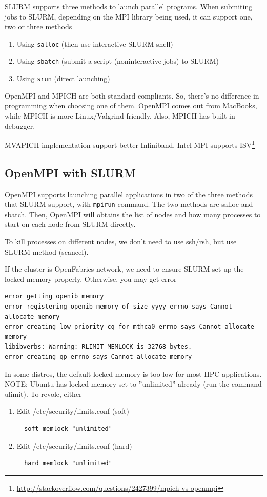 SLURM supports three methods to launch parallel programs. When submiting jobs to
SLURM, depending on the MPI library being used, it can support one, two or three
methods
\begin{enumerate}
  \item Using \verb!salloc! (then use interactive SLURM shell)
  \item Using \verb!sbatch! (submit a script (noninteractive jobs) to SLURM)
  \item Using \verb!srun! (direct launching)
\end{enumerate}

OpenMPI and MPICH are both standard compliants. So, there's no difference in
programming when choosing one of them. OpenMPI comes out from MacBooks,
while MPICH is more Linux/Valgrind friendly. Also, MPICH has built-in debugger.

MVAPICH implementation support better Infiniband. Intel MPI supports
ISV\footnote{\url{http://stackoverflow.com/questions/2427399/mpich-vs-openmpi}}

\subsection{OpenMPI with SLURM}

OpenMPI supports launching parallel applications in two of the three methods
that SLURM support, with \verb!mpirun! command. The two methods are salloc and
sbatch. Then, OpenMPI will obtains the list of nodes and how many processes to
start on each node from SLURM directly.



To kill processes on different nodes, we don't need to use ssh/rsh, but use
SLURM-method (scancel). 

If the cluster is OpenFabrics network, we need to ensure SLURM set up the locked
memory properly. Otherwise, you may get error 
\begin{verbatim}
error getting openib memory
error registering openib memory of size yyyy errno says Cannot allocate memory
error creating low priority cq for mthca0 errno says Cannot allocate memory
libibverbs: Warning: RLIMIT_MEMLOCK is 32768 bytes.
error creating qp errno says Cannot allocate memory
\end{verbatim}
In some distros, the default locked memory is too low for most HPC applications.
NOTE: Ubuntu has locked memory set to ''unlimited'' already (run the command
ulimit).  To revole, either
\begin{enumerate}
  \item Edit /etc/security/limits.conf (soft)
  \begin{verbatim}
  soft memlock "unlimited"
  \end{verbatim}
  
  \item Edit  /etc/security/limits.conf (hard)
  \begin{verbatim}
  hard memlock "unlimited"
  \end{verbatim}
\end{enumerate}


